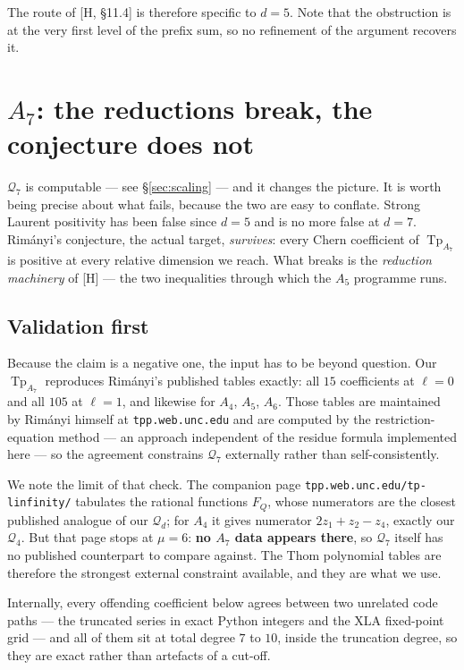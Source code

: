 \documentclass[11pt,a4paper]{article}
\DeclareMathOperator{\Tp}{Tp}
\newcommand{\Qd}{\mathcal{Q}}
\theoremstyle{plain}
\theoremstyle{definition}
\theoremstyle{remark}
\begin{document}
The route of [H, \S11.4] is therefore specific to $d = 5$. Note that the obstruction is at the
very first level of the prefix sum, so no refinement of the argument recovers it.

\section{\texorpdfstring{$A_7$}{A\_7}: the reductions break, the conjecture does not}
\label{sec:a7}

$\Qd_7$ is computable --- see \S\ref{sec:scaling} --- and it changes the picture.  It is worth
being precise about what fails, because the two are easy to conflate.  Strong Laurent positivity
has been false since $d = 5$ and is no more false at $d = 7$.  Rim\'anyi's conjecture, the actual
target, \emph{survives}: every Chern coefficient of $\Tp_{A_7}$ is positive at every relative
dimension we reach.  What breaks is the \emph{reduction machinery} of [H] --- the two inequalities
through which the $A_5$ programme runs.

\subsection{Validation first}

Because the claim is a negative one, the input has to be beyond question.  Our $\Tp_{A_7}$
reproduces Rim\'anyi's published tables exactly: all $15$ coefficients at $\ell = 0$ and all $105$
at $\ell = 1$, and likewise for $A_4$, $A_5$, $A_6$.  Those tables are maintained by Rim\'anyi
himself at \texttt{tpp.web.unc.edu} and are computed by the restriction-equation method --- an
approach independent of the residue formula implemented here --- so the agreement constrains
$\Qd_7$ externally rather than self-consistently.

We note the limit of that check.  The companion page \texttt{tpp.web.unc.edu/tp-linfinity/}
tabulates the rational functions $F_Q$, whose numerators are the closest published analogue of our
$\Qd_d$; for $A_4$ it gives numerator $2z_1 + z_2 - z_4$, exactly our $\Qd_4$.  But that page stops
at $\mu = 6$: \textbf{no $A_7$ data appears there}, so $\Qd_7$ itself has no published counterpart
to compare against.  The Thom polynomial tables are therefore the strongest external constraint
available, and they are what we use.

Internally, every offending coefficient below agrees between two unrelated code paths --- the
truncated series in exact Python integers and the XLA fixed-point grid --- and all of them sit at
total degree $7$ to $10$, inside the truncation degree, so they are exact rather than artefacts of
a cut-off.
\end{document}
